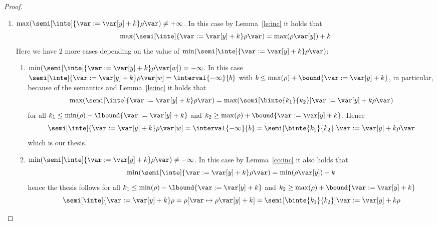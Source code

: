 \begin{proof}
\begin{enumerate}[label=(\arabic*)]
\begin{enumerate}[label=(\roman*)]
    \end{enumerate}
  \item
    \({\max(\semi[\inte]{\var := \var[y] + k}\rho\var)} \neq
    +\infty\). In this case by Lemma~\ref{le:inc} it holds that
    \begin{equation*}
      \max(\semi[\inte]{\var:= \var[y] + k}\rho\var) = \max(\rho\var[y]) + k
    \end{equation*}
    Here we have 2 more cases depending on the value of
    \(\min(\semi[\inte]{\var:= \var[y] + k}\rho\var)\):
    \begin{enumerate}[label=(\roman*)]
    \item
      \({\min(\semi[\inte]{\var:= \var[y] + k}\rho\var[w])} =
      -\infty\). In this case
      \(\semi[\inte]{\var := \var[y] + k}\rho\var[w] =
      \interval{-\infty}{b}\) with
      \(b \leq \max(\rho) + \bound{\var := \var[y] + k}\), in
      particular, because of the semantics and Lemma~\ref{le:inc} it
      holds that
      \begin{equation*}
        \max(\semi[\inte]{\var := \var[y] + k}\rho\var) = \max(\semi[\binte{k_1}{k_2}]{\var := \var[y] + k}\rho\var)
      \end{equation*}
      for all \(k_1 \leq \min(\rho) - \lbound{\var := \var[y] + k}\)
      and \(k_2 \geq \max(\rho) + \bound{\var := \var[y] + k}\). Hence
      \begin{equation*}
        \semi[\inte]{\var := \var[y] + k}\rho\var[w] = \interval{-\infty}{b} = \semi[\binte{k_1}{k_2}]{\var:=\var[y]+k}\rho\var
      \end{equation*}
      which is our thesis.
      
    \item
      \({\min(\semi[\inte]{\var:= \var[y] + k}\rho\var)} \neq
      -\infty\). In this case by Lemma~\ref{co:inc} it also holds that
      \begin{equation*}
        \min(\semi[\inte]{\var := \var[y] + k}\rho\var) = \min(\rho\var[y]) + k
      \end{equation*}
      hence the thesis follows for all
      \(k_1 \leq \min(\rho) - \lbound{\var := \var[y] + k}\) and
      \(k_2 \geq \max(\rho) + \bound{\var := \var[y] + k}\)
      \begin{equation*}
        \semi[\inte]{\var := \var[y] + k}\rho = \rho[\var \mapsto \rho\var[y] + k] = \semi[\binte{k_1}{k_2}]{\var := \var[y] + k}\rho
      \end{equation*}
    \end{enumerate}
  \end{enumerate}
  

\end{proof}
